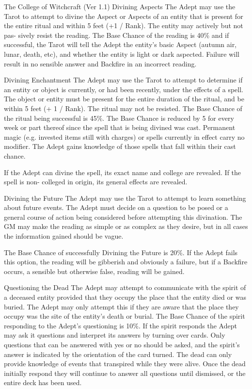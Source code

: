 \begin{Chapter}{The College of Witchcraft (Ver 1.1)}
Divining Aspects The Adept may use the Tarot to 
attempt to divine the Aspect or Aspects of an entity 
that is present for the entire ritual and within 5 feet 
(+1  /  Rank).  The  entity  may  actively  but  not  pas-
sively  resist  the  reading.  The  Base  Chance  of  the 
reading is 40\% and if successful, the Tarot will tell 
the  Adept  the  entity’s  basic  Aspect  (autumn  air, 
lunar, death, etc), and whether the entity is light or 
dark  aspected.  Failure  will  result  in  no  sensible 
answer and Backfire in an incorrect reading. 

Divining  Enchantment  The  Adept  may  use  the 
Tarot to attempt to determine if an entity or object 
is currently, or had been recently, under the effects 
of a spell. The object or entity must be present for 
the  entire  duration  of  the  ritual,  and  be  within  5 
feet  (+  1  /  Rank).  The  ritual  may  not  be  resisted. 
The  Base  Chance  of  the  ritual  being  successful  is 
45\%.  The  Base  Chance  is  reduced  by  5  for  every 
week  or  part  thereof  since  the  spell  that  is  being 
divined  was  cast.  Permanent  magic  (e.g.  invested 
items still with charges) or spells currently in effect 
carry  no  modifier.  The  Adept  gains  knowledge  of 
those spells that fall within their cast chance. 

If  the  Adept  can  divine  the  spell,  its  exact  name 
and  college  are  revealed.  If  the  spell  is  non-
colleged in origin, its general effects are revealed. 

Divining the Future The Adept may use the Tarot 
to  attempt  to  learn  something  about  future  events. 
The  Adept  must  decide  on  a  question  to  be  posed 
or  a  general  course  of  action  being  considered 
before  attempting  this  divination.  The  GM  may 
make  the  reading  as  simple  or  as  complex  as  they 
desire,  but  in  all  cases  the  information  gained 
should be vague. 

The  Base  Chance  of  successfully  Divining  the 
Future  is  20\%.  If  the  Adept  fails  this  option,  the 
reading  will  be  gibberish  and  obviously  a  failure, 
but  if  a  Backfire  occurs,  a  sensible  but  otherwise 
false, reading will be gained. 

Questioning  the  Dead  The  Adept  may  attempt  to 
communicate  with  the  spirit  of  a  deceased  entity 
provided that they occupy the place that the entity 
died  or  was  buried.  The  Adept  may  only  attempt 
this  if  they  are  aware  that  the  place  they  occupy 
was  the  site  of  the  entity’s  death  or  burial.  The 
Base Chance of the spirit responding to the Adept’s 
questioning is 10\%. If the spirit responds the Adept 
may  ask  it  questions  and  interpret  its  answers  by 
turning  over  cards.  Only  questions  that  can  be 
answered  with  yes  or  no  should  be  asked,  and  the 
spirit’s answer is indicated by the orientation of the 
card turned. The dead can only provide knowledge 
of  events  that  transpired  while  they  were  alive. 
Once  the  dead  initially  respond  they  will  continue 
to  answer  all  questions  until  dismissed,  or  the 
entire deck has been used. 



\end{Chapter}
